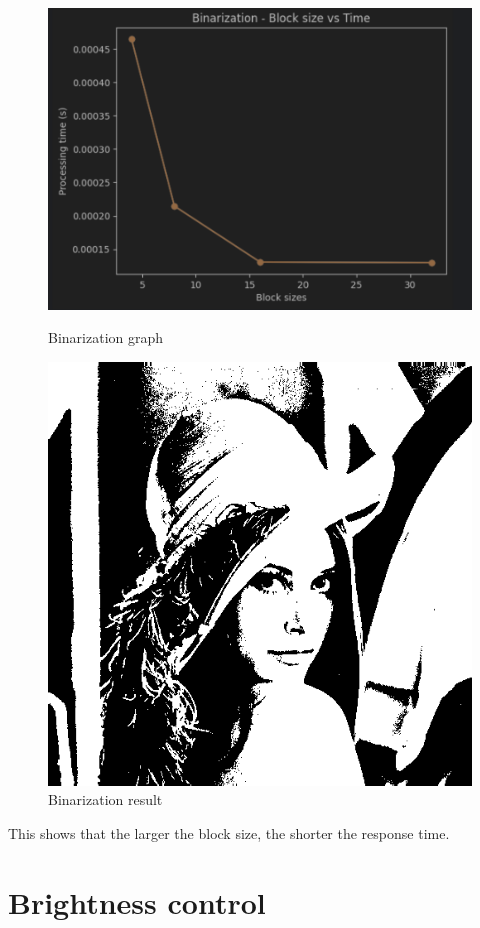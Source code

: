 \documentclass{article}
\begin{document}
\begin{figure}[H]
    \begin{minipage}{0.48\textwidth}
        \centering
        \includegraphics[width=.7\linewidth]{Binarization - Block size vs Time.png}
        \caption{Binarization graph}
        \label{fig:Binarization graph}
    \end{minipage}\hfill
    \begin{minipage}{0.48\textwidth}
        \centering
        \includegraphics[width=.7\linewidth]{binarization.png}
        \caption{Binarization result}
        \label{fig:Binarization result}
    \end{minipage}\hfill
\end{figure}

This shows that the larger the block size, the shorter the response time.

\section{Brightness control}
\end{document}
